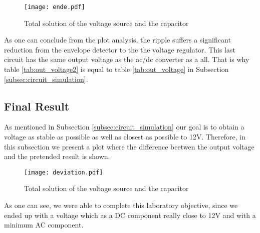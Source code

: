 \begin{figure}[H] \centering
\texttt{[image: ende.pdf]}
\caption{Total solution of the voltage source and the capacitor}
\label{fig:env+vore}
\end{figure}


As one can conclude from the plot analysis, the ripple suffers a significant reduction from the envelope detector to the the voltage regulator. This last circuit has the same output voltage as the ac/dc converter as a all. That is why table \ref{tab:out_voltage2} is equal to table \ref{tab:out_voltage} in Subsection \ref{subsec:circuit_simulation}.



\subsection{Final Result}

\par As mentioned in Subsection \ref{subsec:circuit_simulation} our goal is to obtain a voltage as stable as possible as well as closest as possible to 12V. Therefore, in this subsection we present a plot where the difference beetwen the output voltage and the pretended result is shown.

\begin{figure}[H] \centering
\texttt{[image: deviation.pdf]}
\caption{Total solution of the voltage source and the capacitor}
\label{fig:vo-12}
\end{figure}


As one can see, we were able to complete this laboratory objective, since we ended up with a voltage which as a DC component really close to 12V and with a minimum AC component.



